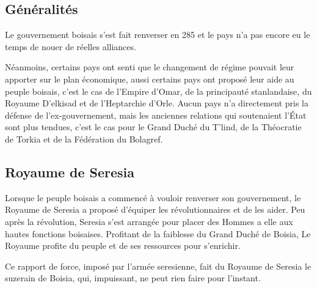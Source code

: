 \documentclass[french, a4paper, 12pt]{article}
\begin{document}
\subsection{Généralités}

Le gouvernement boisais s'est fait renverser en 285 et le pays n'a pas encore eu le temps de nouer de réelles alliances.

Néanmoins, certains pays ont senti que le changement de régime pouvait leur apporter sur le plan économique, aussi certains pays ont proposé leur aide au peuple boisais, c'est le cas de l'Empire d'Omar, de la principauté stanlandaise, du Royaume D'elkisad et de l'Heptarchie d'Orle. Aucun pays n'a directement pris la défense de l'ex-gouvernement, mais les anciennes relations qui soutenaient l'État sont plus tendues, c'est le cas pour le Grand Duché du T'lind, de la Théocratie de Torkia et de la Fédération du Bolagref.

\subsection{Royaume de Seresia}

Lorsque le peuple boisais a commencé à vouloir renverser son gouvernement, le Royaume de Seresia a proposé d'équiper les révolutionnaires et de les aider. Peu après la révolution, Seresia s'est arrangée pour placer des Hommes a elle aux hautes fonctions boisaises. Profitant de la faiblesse du Grand Duché de Boisia, Le Royaume profite du peuple et de ses ressources pour s'enrichir.

Ce rapport de force, imposé par l'armée seresienne, fait du Royaume de Seresia le suzerain de Boisia, qui, impuissant, ne peut rien faire pour l'instant.
\end{document}
